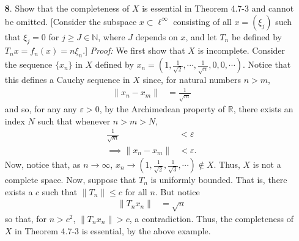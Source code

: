 \documentclass{article}
\begin{document}
\begin{itemize}
    \item[\textbf{8}.] Show that the completeness of $X$ is essential in Theorem 4.7-3 and cannot be omitted. [Consider the subspace $x \subset \ell^{\infty}$ consisting of all $x = (\xi_j)$ such that $\xi_j = 0$ for $j \geq J \in \mathbb{N}$, where $J$ depends on $x$, and let $T_n$ be defined by $T_nx = f_n(x) = n\xi_n$.]
    \newline\newline
    \textit{Proof:} We first show that $X$ is incomplete. Consider the sequence $\{x_n\}$ in $X$ defined by $x_n = (1, \tfrac{1}{\sqrt{2}}, \cdots, \tfrac{1}{\sqrt{n}}, 0, 0, \cdots)$. Notice that this defines a Cauchy sequence in $X$ since, for natural numbers $n > m$,
    \begin{align*}
        \|x_n - x_m\| &= \frac{1}{\sqrt{m}}
    \end{align*}
    and so, for any any $\varepsilon > 0$, by the Archimedean property of $\mathbb{R}$, there exists an index $N$ such that whenever $n > m > N$, 
    \begin{align*}
        \frac{1}{\sqrt{m}} &< \varepsilon\\
        \implies \|x_n - x_m\| &< \varepsilon.
    \end{align*}
    Now, notice that, as $n \to \infty$, $x_n \to (1, \tfrac{1}{\sqrt{2}}, \tfrac{1}{\sqrt{3}}, \cdots) \notin X$. Thus, $X$ is not a complete space. Now, suppose that $T_n$ is uniformly bounded. That is, there exists a $c$ such that $\|T_n\| \leq c$ for all $n$. But notice 
    \begin{align*}
        \|T_nx_n\| &= \sqrt{n}
    \end{align*}
    so that, for $n > c^2$, $\|T_nx_n\| > c$, a contradiction. Thus, the completeness of $X$ in Theorem 4.7-3 is essential, by the above example.



\end{itemize}
\end{document}
